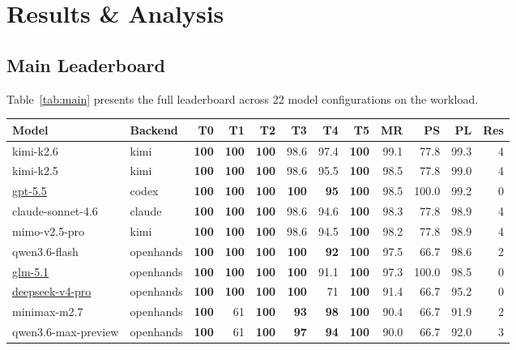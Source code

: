 \section{Results \& Analysis}

\subsection{Main Leaderboard}

Table~\ref{tab:main} presents the full \eva{} leaderboard across 22 model configurations on the \yatcc{} workload.

\begin{table}[t]
\centering
\small
\begin{tabular}{llrrrrrrrrrr}
\toprule
\textbf{Model} & \textbf{Backend} & \textbf{T0} & \textbf{T1} & \textbf{T2} & \textbf{T3} & \textbf{T4} & \textbf{T5} & \textbf{MR} & \textbf{PS} & \textbf{PL} & \textbf{Res} \\
\midrule
kimi-k2.6 & kimi & \textbf{100} & \textbf{100} & \textbf{100} & 98.6 & 97.4 & \textbf{100} & 99.1 & 77.8 & 99.3 & 4 \\
kimi-k2.5 & kimi & \textbf{100} & \textbf{100} & \textbf{100} & 98.6 & 95.5 & \textbf{100} & 98.5 & 77.8 & 99.0 & 4 \\
\underline{gpt-5.5} & codex & \textbf{100} & \textbf{100} & \textbf{100} & \textbf{100} & \textbf{95} & \textbf{100} & 98.5 & 100.0 & 99.2 & 0 \\
claude-sonnet-4.6 & claude & \textbf{100} & \textbf{100} & \textbf{100} & 98.6 & 94.6 & \textbf{100} & 98.3 & 77.8 & 98.9 & 4 \\
mimo-v2.5-pro & kimi & \textbf{100} & \textbf{100} & \textbf{100} & 98.6 & 94.5 & \textbf{100} & 98.2 & 77.8 & 98.9 & 4 \\
qwen3.6-flash & openhands & \textbf{100} & \textbf{100} & \textbf{100} & \textbf{100} & \textbf{92} & \textbf{100} & 97.5 & 66.7 & 98.6 & 2 \\
\underline{glm-5.1} & openhands & \textbf{100} & \textbf{100} & \textbf{100} & \textbf{100} & 91.1 & \textbf{100} & 97.3 & 100.0 & 98.5 & 0 \\
\underline{deepseek-v4-pro} & openhands & \textbf{100} & \textbf{100} & \textbf{100} & \textbf{100} & 71 & \textbf{100} & 91.4 & 66.7 & 95.2 & 0 \\
minimax-m2.7 & openhands & \textbf{100} & 61 & \textbf{100} & \textbf{93} & \textbf{98} & \textbf{100} & 90.4 & 66.7 & 91.9 & 2 \\
qwen3.6-max-preview & openhands & \textbf{100} & 61 & \textbf{100} & \textbf{97} & \textbf{94} & \textbf{100} & 90.0 & 66.7 & 92.0 & 3 \\

\end{tabular}
\end{table}
